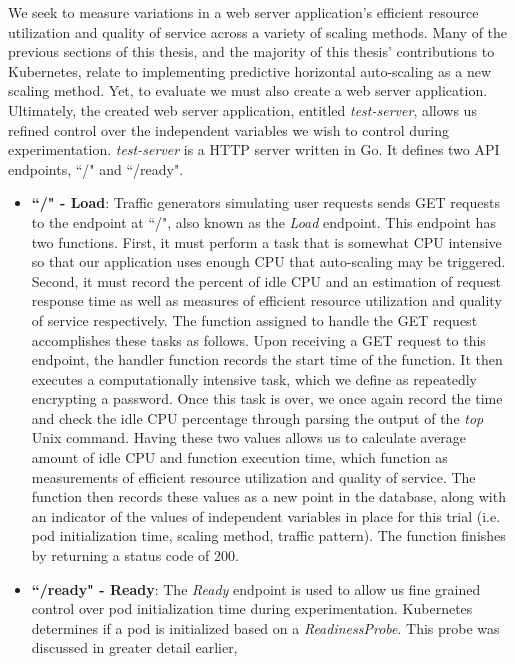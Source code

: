 We seek to measure variations in a web server application's
efficient resource utilization and quality of service across a variety of
scaling methods. Many of the previous sections of this thesis, and the majority
of this thesis' contributions to Kubernetes, relate to implementing predictive
horizontal auto-scaling as a new scaling method. Yet, to evaluate we must also
create a web server application. Ultimately, the created web server application,
entitled \textit{test-server}, allows us refined control over the independent
variables we wish to control during experimentation. \textit{test-server}
is a HTTP server written in Go. It defines two API
endpoints, ``/" and ``/ready".

\begin{itemize}
  \item \textbf{``/" - Load}: Traffic generators simulating user requests
    sends GET requests to the endpoint at ``/", also known as the \textit{Load} endpoint.
    This endpoint has two functions. First, it must perform a task that is
    somewhat CPU intensive so that our application uses enough CPU that
    auto-scaling may be triggered. Second, it must record the percent of idle CPU
    and an estimation of request response time as well as measures of
    efficient resource utilization and quality of service respectively. The
    function assigned to handle the GET request accomplishes these tasks as
    follows. Upon receiving a GET request to this endpoint, the handler function
    records the start time of the function. It then executes a computationally intensive
    task, which we define as repeatedly encrypting a password. Once this task
    is over, we once again record the time and check the idle CPU percentage
    through parsing the output of the \textit{top} Unix command.
    Having these two values allows us to calculate average amount of idle CPU
    and function execution time, which function as measurements of
    efficient resource utilization and quality of service. The function then
    records these values as a new point in the database, along with
    an indicator of the values of independent variables in place for this trial
    (i.e. pod initialization time, scaling method, traffic pattern). The function finishes by
    returning a status code of 200.
  \item \textbf{``/ready" - Ready}: The \textit{Ready} endpoint is used to allow
    us fine grained control over pod initialization time during experimentation.
    Kubernetes determines if a pod is initialized based on a
    \textit{ReadinessProbe}. This probe was discussed in greater detail earlier,

\end{itemize}
